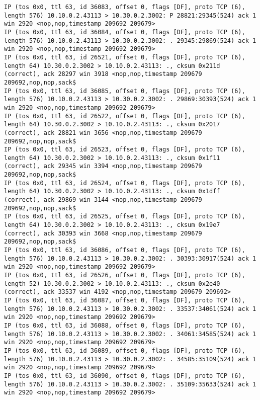 \documentclass[a4paper,12pt]{article}
\begin{document}
\begin{lstlisting}
IP (tos 0x0, ttl 63, id 36083, offset 0, flags [DF], proto TCP (6), length 576) 10.10.0.2.43113 > 10.30.0.2.3002: P 28821:29345(524) ack 1 win 2920 <nop,nop,timestamp 209692 209679>
IP (tos 0x0, ttl 63, id 36084, offset 0, flags [DF], proto TCP (6), length 576) 10.10.0.2.43113 > 10.30.0.2.3002: . 29345:29869(524) ack 1 win 2920 <nop,nop,timestamp 209692 209679>
IP (tos 0x0, ttl 63, id 26521, offset 0, flags [DF], proto TCP (6), length 64) 10.30.0.2.3002 > 10.10.0.2.43113: ., cksum 0x211d (correct), ack 28297 win 3918 <nop,nop,timestamp 209679 209692,nop,nop,sack$
IP (tos 0x0, ttl 63, id 36085, offset 0, flags [DF], proto TCP (6), length 576) 10.10.0.2.43113 > 10.30.0.2.3002: . 29869:30393(524) ack 1 win 2920 <nop,nop,timestamp 209692 209679>
IP (tos 0x0, ttl 63, id 26522, offset 0, flags [DF], proto TCP (6), length 64) 10.30.0.2.3002 > 10.10.0.2.43113: ., cksum 0x2017 (correct), ack 28821 win 3656 <nop,nop,timestamp 209679 209692,nop,nop,sack$
IP (tos 0x0, ttl 63, id 26523, offset 0, flags [DF], proto TCP (6), length 64) 10.30.0.2.3002 > 10.10.0.2.43113: ., cksum 0x1f11 (correct), ack 29345 win 3394 <nop,nop,timestamp 209679 209692,nop,nop,sack$
IP (tos 0x0, ttl 63, id 26524, offset 0, flags [DF], proto TCP (6), length 64) 10.30.0.2.3002 > 10.10.0.2.43113: ., cksum 0x1dff (correct), ack 29869 win 3144 <nop,nop,timestamp 209679 209692,nop,nop,sack$
IP (tos 0x0, ttl 63, id 26525, offset 0, flags [DF], proto TCP (6), length 64) 10.30.0.2.3002 > 10.10.0.2.43113: ., cksum 0x19e7 (correct), ack 30393 win 3668 <nop,nop,timestamp 209679 209692,nop,nop,sack$
IP (tos 0x0, ttl 63, id 36086, offset 0, flags [DF], proto TCP (6), length 576) 10.10.0.2.43113 > 10.30.0.2.3002: . 30393:30917(524) ack 1 win 2920 <nop,nop,timestamp 209692 209679>
IP (tos 0x0, ttl 63, id 26526, offset 0, flags [DF], proto TCP (6), length 52) 10.30.0.2.3002 > 10.10.0.2.43113: ., cksum 0x2e40 (correct), ack 33537 win 4192 <nop,nop,timestamp 209679 209692>
IP (tos 0x0, ttl 63, id 36087, offset 0, flags [DF], proto TCP (6), length 576) 10.10.0.2.43113 > 10.30.0.2.3002: . 33537:34061(524) ack 1 win 2920 <nop,nop,timestamp 209692 209679>
IP (tos 0x0, ttl 63, id 36088, offset 0, flags [DF], proto TCP (6), length 576) 10.10.0.2.43113 > 10.30.0.2.3002: . 34061:34585(524) ack 1 win 2920 <nop,nop,timestamp 209692 209679>
IP (tos 0x0, ttl 63, id 36089, offset 0, flags [DF], proto TCP (6), length 576) 10.10.0.2.43113 > 10.30.0.2.3002: . 34585:35109(524) ack 1 win 2920 <nop,nop,timestamp 209692 209679>
IP (tos 0x0, ttl 63, id 36090, offset 0, flags [DF], proto TCP (6), length 576) 10.10.0.2.43113 > 10.30.0.2.3002: . 35109:35633(524) ack 1 win 2920 <nop,nop,timestamp 209692 209679>

\end{lstlisting}
\end{document}
